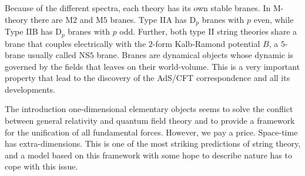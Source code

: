 \documentclass[draft]{phd}
\begin{document}
			Because of the different spectra, each theory has its own stable branes. In M-theory there are M$2$ and M$5$ branes.
Type IIA has $\mathrm{D}_p$ branes with $p$ even, while Type IIB has $\mathrm{D}_p$ branes with $p$ odd.
Further, both type II string theories share a brane that couples electrically with the $2$-form Kalb-Ramond potential $B$, 
a $5$-brane usually called NS$5$ brane.
Branes are dynamical objects whose dynamic is governed by the fields that leaves on their world-volume. This is a very important property that lead to
the discovery of the AdS/CFT correspondence and all its developments.

			
%

%
%		
		
		The introduction one-dimensional elementary objects seems to solve the conflict between general relativity and quantum field theory and to provide a framework for the unification of all fundamental forces.
		However, we pay a price. Space-time has extra-dimensions.
		This is one of the most striking predictions of string theory, and a model based on this framework with some hope to describe nature has to cope with this issue.
		
\end{document}
